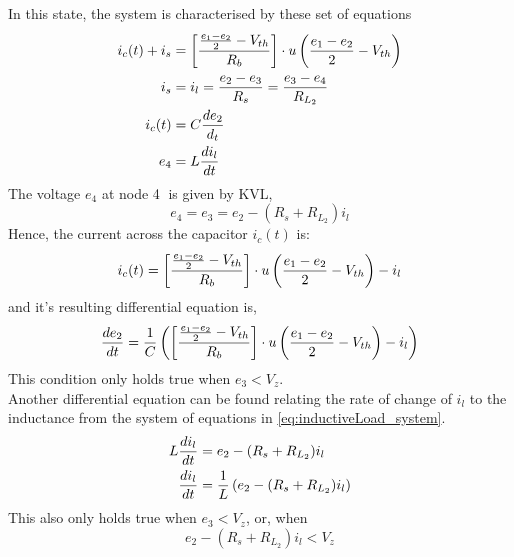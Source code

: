 In this state, the system is characterised by these set of equations
\begin{align}
	i_c(t) + i_s &= \left[\frac{\frac{e_1 - e_2}{2} - V_{th}}{R_b} \right]\cdot u\left(\frac{e_1 - e_2}{2} - V_{th} \right) \\
	i_s &= i_l = \frac{e_2 - e_3}{R_s} = \frac{e_3 - e_4}{R_{L_2}} \\
	i_c(t) &= C \frac{de_2}{d_t} \\
	e_4 &= L\frac{di_l}{dt}
	\label{eq:inductiveLoad_system}
\end{align}
The voltage $e_4$ at node \textcircled{4} is given by KVL,
\begin{equation}
	e_4 = e_3 = e_2 - (R_s + R_{L_2})i_l
\end{equation}
Hence, the current across the capacitor $i_c(t)$ is:
\begin{equation}
	i_c(t) = \left[\frac{\frac{e_1 - e_2}{2} - V_{th}}{R_b} \right]\cdot u\left(\frac{e_1 - e_2}{2} - V_{th} \right) - i_l
\end{equation}
and it's resulting differential equation is,
\begin{equation}
	\frac{de_2}{dt} = \frac{1}{C}\left(\left[\frac{\frac{e_1 - e_2}{2} - V_{th}}{R_b} \right]\cdot u\left(\frac{e_1 - e_2}{2} - V_{th} \right) - i_l \right)
	\label{eq:inductiveLoad_DiffEq1}
\end{equation}
This condition only holds true when $e_3 < V_z$.
\\

Another differential equation can be found relating the rate of change of $i_l$ to the inductance from the system of equations in \eqref{eq:inductiveLoad_system}.
\begin{equation}
	\begin{split}
		L\frac{di_l}{dt} &= e_2 - (R_s + R_{L_2})i_l \\
		 \frac{di_l}{dt} &= \frac{1}{L}\left(e_2 - (R_s + R_{L_2})i_l \right)
	\end{split}
	\label{eq:inductiveLoad_DiffEq2}
\end{equation}
This also only holds true when $e_3 < V_z$, or, when
\begin{equation}
	e_2 - (R_s + R_{L_2})i_l < V_z
\end{equation}

